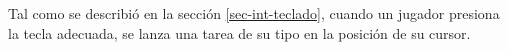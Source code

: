 Tal como se describió en la sección \ref{sec-int-teclado}, cuando un jugador presiona la tecla adecuada, se lanza una tarea de su tipo en la posición de su cursor.






\begin{comment}
4.7.
Ejercicio 7

a) Construir una función para inicializar las estructuras de datos del scheduler.


b) Crear la función sched proximo indice() que devuelve el ındice en la GDT de la próxima
tarea a ser ejecutada. Construir la rutina de forma devuelva una tarea de cada jugador
por vez según se explica en la sección 3.2

c) Modificar la rutina de la interrupción 0x66, para que implemente los tres servicios según
se indica en la sección 3.1.1.


d) Modificar el código necesario para que se realice el intercambio de tareas por cada ciclo de
reloj. El intercambio se realizará según indique la función sched proximo indice().


e) Modificar las rutinas de excepciones del procesador para que desalojen y destruyan a la
tarea que estaba corriendo y corran la próxima.


f) Implementar el mecanismo de debugging explicado en la sección 3.4 que indicará en pan-
talla la razón del desalojo de una tarea.


Nota: Se recomienda construir funciones en C que ayuden a resolver problemas como
convertir direcciones de el mapa a direcciones fısicas o buscar la proxima tarea a ejecutar.

\end{comment}


\label{sec-desalojo}

